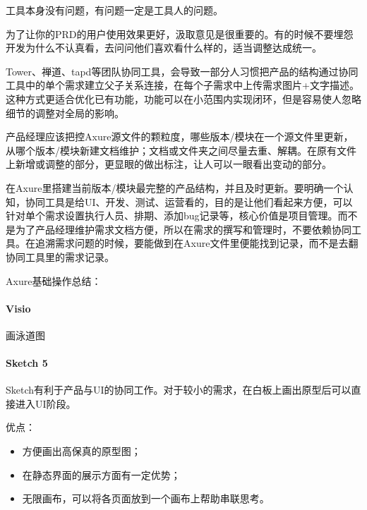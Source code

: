 \documentclass[letterpaper,10pt,english]{sphinxmanual}
\begin{document}
工具本身没有问题，有问题一定是工具人的问题。

为了让你的PRD的用户使用效果更好，汲取意见是很重要的。有的时候不要埋怨开发为什么不认真看，去问问他们喜欢看什么样的，适当调整达成统一。

Tower、禅道、tapd等团队协同工具，会导致一部分人习惯把产品的结构通过协同工具中的单个需求建立父子关系连接，在每个子需求中上传需求图片+文字描述。这种方式更适合优化已有功能，功能可以在小范围内实现闭环，但是容易使人忽略细节的调整对全局的影响。

产品经理应该把控Axure源文件的颗粒度，哪些版本/模块在一个源文件里更新，从哪个版本/模块新建文档维护；文档或文件夹之间尽量去重、解耦。在原有文件上新增或调整的部分，更显眼的做出标注，让人可以一眼看出变动的部分。

在Axure里搭建当前版本/模块最完整的产品结构，并且及时更新。要明确一个认知，协同工具是给UI、开发、测试、运营看的，目的是让他们看起来方便，可以针对单个需求设置执行人员、排期、添加bug记录等，核心价值是项目管理。而不是为了产品经理维护需求文档方便，所以在需求的撰写和管理时，不要依赖协同工具。在追溯需求问题的时候，要能做到在Axure文件里便能找到记录，而不是去翻协同工具里的需求记录。

Axure基础操作总结：


\paragraph{Visio}
\label{\detokenize{chapter_knowledge/tools:visio}}
画泳道图%
\begin{footnote}[578]\sphinxAtStartFootnote
{}
%
\end{footnote}


\paragraph{Sketch 5\sphinxfootnotemark[579]}
\label{\detokenize{chapter_knowledge/tools:sketch-5}}%
\begin{footnotetext}[579]\sphinxAtStartFootnote
{}
%
\end{footnotetext}\ignorespaces 
Sketch有利于产品与UI的协同工作。对于较小的需求，在白板上画出原型后可以直接进入UI阶段。

优点：
\begin{itemize}
\item {} 
方便画出高保真的原型图；

\item {} 
在静态界面的展示方面有一定优势；

\item {} 
无限画布，可以将各页面放到一个画布上帮助串联思考。

\end{itemize}
\end{document}
